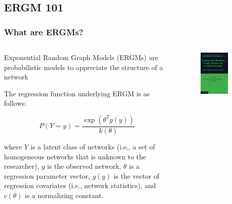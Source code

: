 \documentclass[show notes, aspectratio=1610]{beamer}
\begin{document}
\subsection{ERGM 101}

\begin{frame}
  \frametitle{What are ERGMs?}
  \small
  \begin{columns}
    \begin{column}{0.45\textwidth}
    Exponential Random Graph Models (ERGMs) are probabilistic models to appreciate the structure of a network \cite{lusher2013exponential}
   
    \vspace{1em}

    The regression function underlying ERGM is as follows:

    \begin{equation}
      P(Y = y) = \frac{\exp(\theta^T g(y))}{k(\theta)}
    \end{equation}

    where $Y$ is a latent class of networks (i.e., a set of homogeneous networks that is unknown to the researcher), $y$ is the observed network, $\theta$ is a regression parameter vector, $g(y)$ is the vector of regression covariates (i.e., network statistics), and $c(\theta)$ is a normalizing constant.
    \end{column}
    \begin{column}{0.45\textwidth}
      \begin{figure}
        \includegraphics[width=0.8\textwidth]{../images/ergms}
      \end{figure}
    \end{column}
  \end{columns}
\end{frame}
\end{document}

